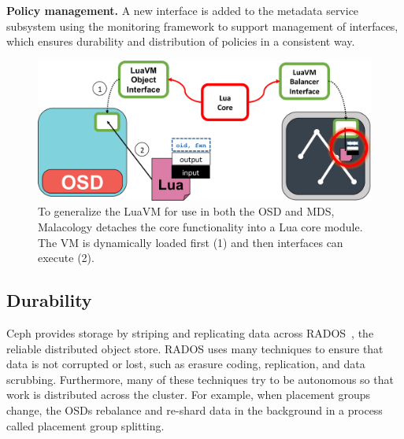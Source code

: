 \documentclass[10pt,twocolumn]{article}
\begin{document}
{\bf Policy management.} A new interface is added to the metadata service
subsystem using the monitoring framework to support management of interfaces,
which ensures durability and distribution of policies in a consistent way.

\begin{figure}[h]
\centering
\includegraphics{figures/cls-osd-mds.png}
\caption{To generalize the LuaVM for use in both the OSD and MDS,
Malacology detaches the core functionality into a Lua core module. The
VM is dynamically loaded first (1) and then interfaces can execute (2).
\label{fig:cls-osd-mds}}
\end{figure}



\subsection{Durability}
\label{sec:durability}

Ceph provides storage by striping and replicating data across
RADOS~\cite{weil_rados_2007}, the reliable distributed object store. RADOS
uses many techniques to ensure that data is not corrupted or lost, such as
erasure coding, replication, and data scrubbing. Furthermore, many of these
techniques try to be autonomous so that work is distributed across the
cluster. For example, when placement groups change, the OSDs rebalance and
re-shard data in the background in a process called placement group splitting.
\end{document}
